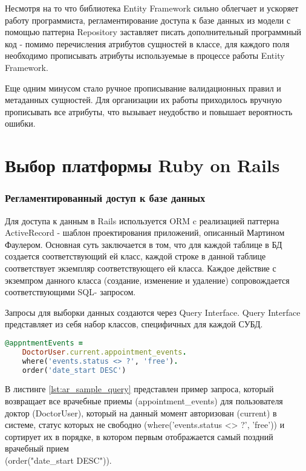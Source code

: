 Несмотря на то что библиотека Entity Framework сильно облегчает и ускоряет
работу программиста, регламентирование доступа к базе данных из модели с помощью
паттерна Repository заставляет писать дополнительный программный код - помимо
перечисления атрибутов сущностей в классе, для каждого поля  необходимо
прописывать атрибуты используемые в процессе работы Entity Framework.

Еще одним минусом стало ручное прописывание валидационных правил и метаданных сущностей. 
Для организации их работы приходилось вручную прописывать все атрибуты, что вызывает 
неудобство и повышает вероятность ошибки.

\section{Выбор платформы Ruby on Rails}
\subsubsection{Регламентированный доступ к базе данных}
Для доступа к данным в Rails используется ORM c реализацией паттерна
ActiveRecord - шаблон проектирования приложений, описанный Мартином Фаулером.
Основная суть заключается в том, что для каждой таблице в БД создается
соответствующий ей класс, каждой строке в данной таблице соответствует экземпляр
соответствующего ей класса. Каждое действие с экземпром данного класса
(создание, изменение и удаление) сопровождается соответствующими SQL- запросом.

Запросы для выборки данных создаются через Query Interface. Query Interface
представляет из себя набор классов, специфичных для каждой СУБД.

\begin{lstlisting}[language=Ruby,caption=Запрос через ActiveRecord,label={lst:ar_sample_query}] 
@appntmentEvents = 
	DoctorUser.current.appointment_events.
	where('events.status <> ?', 'free').
	order('date_start DESC')
\end{lstlisting}

В листинге \ref{lst:ar_sample_query} представлен пример запроса, который
возвращает все врачебные приемы (appointment\_events) для пользователя доктор (DoctorUser), 
который на данный момент авторизован (current)
в системе, статус которых не свободно (where('events.status <> ?', 'free')) и
сортирует их в порядке, в котором первым отображается самый поздний врачебный прием
\\ (order("date\_start DESC")).

